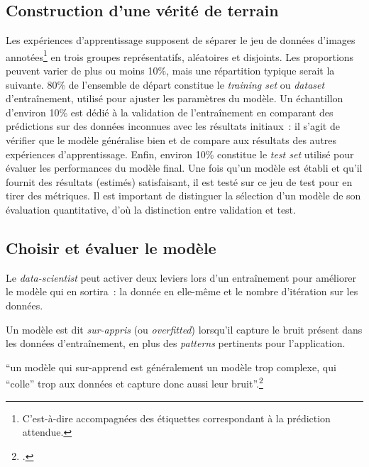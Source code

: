 \hypertarget{construction-dune-verite-de-terrain}{%
\subsection{Construction d'une vérité de
terrain}\label{construction-dune-verite-de-terrain}}

Les expériences d'apprentissage supposent de séparer le jeu de données
d'images annotées\footnote{C'est-à-dire accompagnées des étiquettes
  correspondant à la prédiction attendue.} en trois groupes
représentatifs, aléatoires et disjoints. Les proportions peuvent varier
de plus ou moins 10\%, mais une répartition typique serait la suivante.
80\% de l'ensemble de départ constitue le \emph{training set} ou \textit{dataset}
d'entraînement, utilisé pour ajuster les paramètres du modèle. Un
échantillon d'environ 10\% est dédié à la validation de l'entraînement
en comparant des prédictions sur des données inconnues avec les
résultats initiaux~: il s'agit de vérifier que le modèle généralise bien
et de compare aux résultats des autres expériences d'apprentissage.
Enfin, environ 10\% constitue le \emph{test set} utilisé pour évaluer
les performances du modèle final. Une fois qu'un modèle est établi et
qu'il fournit des résultats (estimés) satisfaisant, il est testé sur ce
jeu de test pour en tirer des métriques. Il est important de distinguer
la sélection d'un modèle de son évaluation quantitative, d'où la
distinction entre validation et test.

\hypertarget{choisir-et-evaluer-le-modele}{%
\subsection{Choisir et évaluer le
modèle}\label{choisir-et-evaluer-le-modele}}

Le \textit{data-scientist} peut activer deux leviers lors d'un entraînement pour
améliorer le modèle qui en sortira~: la donnée en elle-même et le nombre
d'itération sur les données.

Un modèle est dit \emph{sur-appris} (ou \emph{overfitted}) lorsqu'il
capture le bruit présent dans les données d'entraînement, en plus des
\textit{patterns} pertinents pour l'application.

\begin{kwote}                                       
``un modèle qui sur-apprend est généralement un modèle trop complexe,
qui ``colle'' trop aux données et capture donc aussi leur
bruit''.\footcite[p.29]{azencott_introduction_2022}
                      \end{kwote}       

